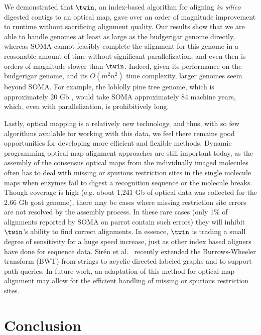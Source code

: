 \documentclass[doctor]{thesis}
\begin{document}
We demonstrated that $\twin$, an index-based algorithm for aligning {\em in silico} digested contigs to an optical map, gave over an order of magnitude improvement to runtime without sacrificing alignment quality. Our results show that we are able to handle genomes at least as large as the budgerigar genome directly, whereas SOMA cannot feasibly complete the alignment for this genome in a reasonable amount of time without significant parallelization, and even then is orders of magnitude slower than $\twin$. Indeed, given its performance on the budgerigar genome, and its $O(m^2 n^2)$ time complexity, larger genomes seem beyond SOMA.  For example, the loblolly pine tree genome, which is approximately 20 Gb \cite{pinetree}, would take SOMA approximately 84 machine years, which, even with parallelization, is prohibitively long.

Lastly, optical mapping is a relatively new technology, and thus, with so few algorithms available for working with this data, we feel there remains good opportunities for developing more efficient and flexible methods. Dynamic programming optical map alignment approaches are still important today, as the assembly of the consensus optical maps from the individually imaged molecules often has to deal with missing or spurious restriction sites in the single molecule maps when enzymes fail to digest a recognition sequence or the molecule breaks.  Though coverage is high (e.g. about 1,241 Gb of optical data was collected for the 2.66 Gb goat genome), there may be cases where missing restriction site errors are not resolved by the assembly process.   In these rare cases (only 1\% of alignments reported by SOMA on parrot contain such errors) they will inhibit $\twin$'s ability to find correct alignments.  In essence, $\twin$ is trading a small degree of sensitivity for a huge speed increase, just as other index based aligners have done for sequence data.  Sir\'{e}n et al.~\cite{dag_method} recently extended the Burrows-Wheeler transform (BWT) from strings to acyclic directed labeled graphs and to support path queries. In future work, an adaptation of this method for optical map alignment may allow for the efficient handling of missing or spurious restriction sites.

 
\makeatletter{} \section{Conclusion}
\end{document}
